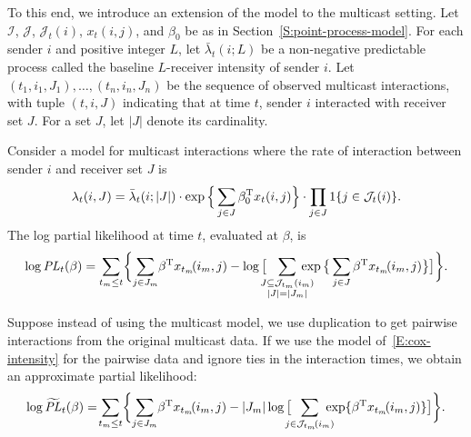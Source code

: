 \documentclass[final]{statsoc}
\begin{document}
To this end, we introduce an extension of the model to the multicast setting.
Let $\mathcal{I}$, $\mathcal{J}$, $\mathcal{J}_t(i)$, $x_t(i,j)$,
and $\beta_0$ be as in Section~\ref{S:point-process-model}.  For each sender
$i$ and positive integer $L$, let $\bar \lambda_t(i ; L)$ be a non-negative
predictable process called the baseline $L$-receiver intensity of sender $i$.
Let $(t_1, i_1, J_1), \ldots, (t_n, i_n, J_n)$ be the
sequence of observed multicast interactions, with tuple $(t, i, J)$
indicating that at  time $t$, sender $i$ interacted with receiver set $J$.
For a set $J$, let $|J|$ denote its cardinality.

Consider a model for multicast interactions where the rate of interaction
between sender $i$ and receiver set $J$ is
\begin{equation}\label{E:intensity-multiple}
    \lambda_t(i,J)
        =
        \bar \lambda_t(i ; |J|)
        \cdot
        \exp\Big\{
            \sum_{j \in J}
                \beta_0^{\mathrm{T}}  x_t(i,j)
        \Big\}
        \cdot
        \prod_{j \in J}
        1\{ j \in \mathcal{J}_t(i) \}.
\end{equation}
The log partial likelihood at time $t$, evaluated at $\beta$, is
\begin{equation}\label{E:log-pl-multiple}
    \log
    \mathit{PL}_t(\beta)
        =
        \sum_{t_m \leq t}\!
        \bigg\{\!
            \sum_{j \in J_m}\!
                \beta^\trans x_{t_m}\!(i_m, j)
            -
            \log\big[
                \!\!\!\!
                \sum_{\substack{J \subseteq \mathcal{J}_{t_m}(i_m) \\
                               |J| = |J_m|}}\!\!\!\!\!\!\!
                    \exp\big\{
                        \sum_{j \in J}
                            \beta^\trans x_{t_m}\!(i_m, j)
                    \big\}
            \big]
        \bigg\}.
\end{equation}

Suppose instead of using the multicast model, we use duplication to get
pairwise interactions from the original multicast data.  If we use
the model of~\eqref{E:cox-intensity} for the pairwise data and ignore ties in
the interaction times, we obtain an approximate partial likelihood:
\begin{equation}\label{E:log-pl-multiple-approx}
    \log
    \widetilde{\mathit{PL}}_t(\beta)
        =\!
        \sum_{t_m \leq t}\!
        \bigg\{\!
            \sum_{j \in J_m}\!
                \beta^\trans x_{t_m}\!(i_m, j)
            -
            |J_m|
            \log\big[
                \!\!\!\!
                \sum_{j \in \mathcal{J}_{t_m}\!(i_m)}\!\!\!\!\!
                    \exp\{ \beta^\trans x_{t_m}\!(i_m, j)\}
            \big]
        \bigg\}.
\end{equation}
\end{document}

